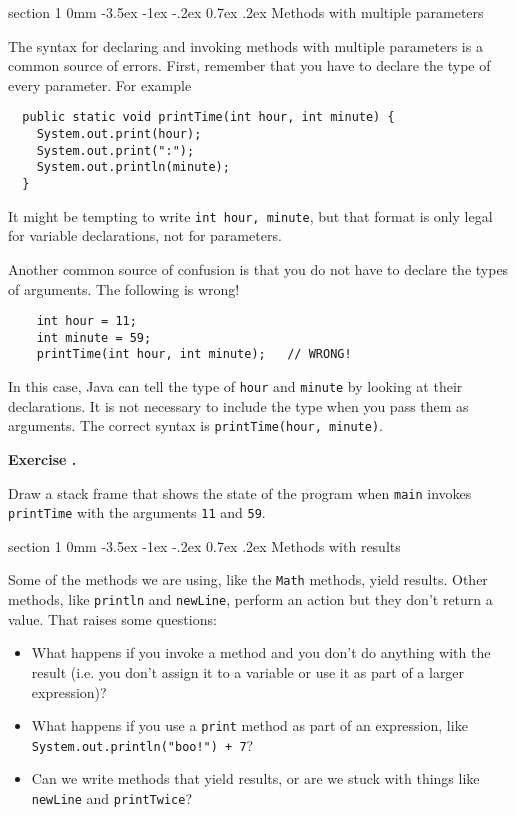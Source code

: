 \documentclass{book}
\makeatletter
\newcounter{exercisenum}
\renewcommand{\theexercisenum}{{\thechapter}.\arabic{exercisenum}}
\newenvironment{exercisesize}{\begin{small}}{\end{small}}
\newcommand{\exerciseheader}[2]{                                          
     
  \begin{exercisesize}                                                    
     
     
  \def\theenumi{\alph{enumi}}                                             
  \def\labelenumi{\theenumi.}                                             
  \def\theenumii{\roman{enumii}}                                          
  \def\labelenumii{\theenumii.}                                           
  {\bf Exercise {#1}{#2}}\hspace{0.1in}                 
}
\newcommand{\startexercise}[1]{%
  \refstepcounter{exercisenum}                                            
  \exerciseheader{\theexercisenum}{#1}                                    
}
\newcommand{\stopexercise}{%
  {\hfill}                                                               
  \end{exercisesize}      
}
\newcommand{\normaldif}{}
\newenvironment{exercise}{\startexercise{\normaldif{}}}{\stopexercise}
\renewcommand{\section}{\@startsection 
    {section} {1} {0mm}%
    {-3.5ex \@plus -1ex \@minus -.2ex}%
    {0.7ex \@plus.2ex}%
    {\normalfont\Large\bfseries}}
\makeatother
\begin{document}
\section {Methods with multiple parameters}
\label{time}

The syntax for declaring and invoking methods with multiple
parameters is a common source of errors.  First, remember
that you have to declare the type of every parameter.  For
example

\begin{verbatim}
  public static void printTime(int hour, int minute) {
    System.out.print(hour);
    System.out.print(":");
    System.out.println(minute);
  }
\end{verbatim}
%
It might be tempting to write {\tt int hour, minute}, but
that format is only legal for variable declarations, not
for parameters.

Another common source of confusion is that you do not have
to declare the types of arguments.  The following is wrong!

\begin{verbatim}
    int hour = 11;
    int minute = 59;
    printTime(int hour, int minute);   // WRONG!
\end{verbatim}
%
In this case, Java can tell the type of {\tt hour}
and {\tt minute} by looking at their declarations.  It is
not necessary to include the type when you pass them
as arguments.  The correct
syntax is {\tt printTime(hour, minute)}.

\begin{exercise}
Draw a stack frame that shows the state of the program
when {\tt main} invokes {\tt printTime}
with the arguments {\tt 11} and {\tt 59}.
\end{exercise}


\section {Methods with results}

Some of the methods we are using,
like the {\tt Math} methods, yield results.  Other methods,
like {\tt println} and {\tt newLine}, perform an action but
they don't return a value.  That raises some questions:

\begin{itemize}

\item What happens if you invoke a method and you don't
do anything with the result (i.e. you don't assign it to
a variable or use it as part of a larger expression)?

\item What happens if you use a {\tt print} method as part
of an expression, like {\tt System.out.println("boo!") + 7}?

\item Can we write methods that yield results, or are we
stuck with things like {\tt newLine} and {\tt printTwice}?

\end{itemize}
\end{document}
